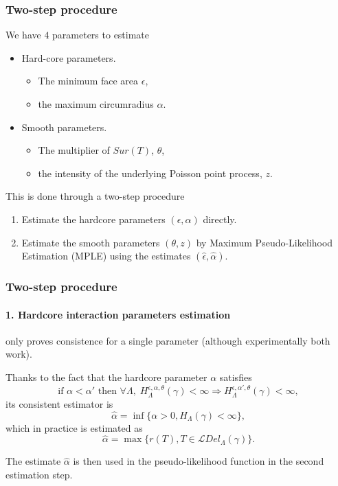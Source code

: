 \documentclass[c, 10pt]{beamer}
\begin{document}
\begin{frame}\frametitle{Two-step procedure}
\begin{small}
We have $4$ parameters to estimate
\begin{itemize}
\item Hard-core parameters.
    \begin{itemize}
    \item The minimum face area $\epsilon$,
    \item the maximum circumradius $\alpha$.
    \end{itemize}
\item Smooth parameters.
    \begin{itemize}
    \item The multiplier of $Sur(T)$, $\theta$,
    \item the intensity of the underlying Poisson point process, $z$.
    \end{itemize}
\end{itemize}
\vspace{5mm}
This is done through a \alert{two-step procedure}
\begin{enumerate}
    \item Estimate the hardcore parameters $(\epsilon, \alpha)$ directly.
    \item Estimate the smooth parameters $(\theta,z)$ by \alert{Maximum Pseudo-Likelihood Estimation} (MPLE) using the estimates $(\hat\epsilon,\hat\alpha)$.
\end{enumerate}
\end{small}


\end{frame}

\begin{frame}\frametitle{Two-step procedure}\framesubtitle{1. Hardcore interaction parameters estimation}
\begin{small}
 only proves consistence for a single parameter (although experimentally both work).\newline

Thanks to the fact that the hardcore parameter $\alpha$ satisfies
$$ \text{if } \alpha < \alpha' \text{ then  } \forall \Lambda, \; H^{\epsilon,\alpha,\theta}_\Lambda(\gamma) < \infty \Rightarrow  H^{\epsilon,\alpha',\theta}_\Lambda(\gamma)<\infty,$$ 
its consistent estimator is
$$\hat\alpha = \inf\{\alpha > 0, H_\Lambda(\gamma) < \infty \},$$
which in practice is estimated as
$$\hat\alpha = \max\{r(T), T\in \mathcal LDel_\Lambda(\gamma)\}.$$

The estimate $\hat\alpha$ is then used in the pseudo-likelihood function in the second estimation step.

\end{small}
\end{frame}
\end{document}
